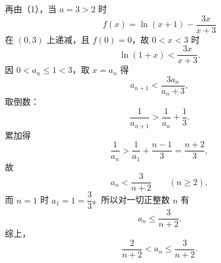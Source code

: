 \begin{answer}
再由（1），当 $a=3>2$ 时
\nopagebreak[4]
\[f(x)=\ln(x+1)-\frac{3x}{x+3}\]
在 $(0,3)$ 上递减，且 $f(0)=0$，故 $0<x<3$ 时
\nopagebreak[4]
\[\ln(1+x)<\frac{3x}{x+3}.\]
因 $0<a_n\leqslant1<3$，取 $x=a_n$ 得
\nopagebreak[4]
\[a_{n+1}<\frac{3a_n}{a_n+3},\]
取倒数：
\nopagebreak[4]
\[\frac{1}{a_{n+1}}>\frac{1}{a_n}+\frac13.\]
累加得
\nopagebreak[4]
\[\frac{1}{a_n}>\frac{1}{a_1}+\frac{n-1}{3}=\frac{n+2}{3},\]
故
\nopagebreak[4]
\[a_n<\frac{3}{n+2}\qquad(n\geqslant2),\]
而 $n=1$ 时 $a_1=1=\dfrac33$。所以对一切正整数 $n$ 有
\nopagebreak[4]
\[a_n\leqslant\frac{3}{n+2}.\]
综上，
\nopagebreak[4]
\[\frac{2}{n+2}<a_n\leqslant\frac{3}{n+2}.\]



\end{answer}